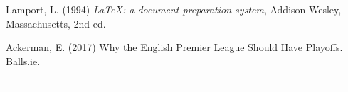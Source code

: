 \begin{thebibliography}{a}

	 Lamport, L. (1994) \emph{\LaTeX: a document preparation system}, Addison Wesley, Massachusetts, 2nd ed.

	 Ackerman, E. (2017) Why the English Premier League Should Have Playoffs. Balls.ie.

------------------------------------------------------



\end{thebibliography}
%
%